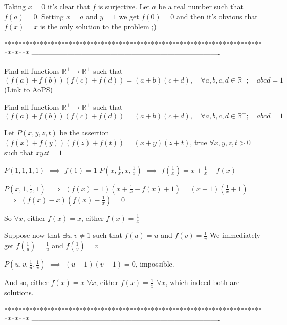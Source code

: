 \begin{solution}
	Taking $x=0$ it's clear that $f$ is surjective. Let $a$ be a real number such that$f(a)=0$. Setting $x=a$ and $y=1$ we get $f(0)=0$ and then it's obvious that $f(x)=x$ is the only solution to the problem ;)
\end{solution}
*******************************************************************************
-------------------------------------------------------------------------------

\begin{problem}
	Find all functions $\mathbb R^+\to\mathbb R^+$ such that \[(f(a)+f(b))(f(c)+f(d))=(a+b)(c+d), \quad \forall a,b,c,d\in\mathbb R^+; \quad abcd=1\]
	\flushright \href{https://artofproblemsolving.com/community/c6h612328}{(Link to AoPS)}
\end{problem}



\begin{solution}
	\begin{tcolorbox}Find all functions $\mathbb R^+\to\mathbb R^+$ such that \[(f(a)+f(b))(f(c)+f(d))=(a+b)(c+d), \quad \forall a,b,c,d\in\mathbb R^+; \quad abcd=1\]\end{tcolorbox}
Let $P(x,y,z,t)$ be the assertion $(f(x)+f(y))(f(z)+f(t))=(x+y)(z+t)$, true $\forall x,y,z,t>0$ such that $xyzt=1$

$P(1,1,1,1)$ $\implies$ $f(1)=1$
$P(x,\frac 1x,x,\frac 1x)$ $\implies$ $f(\frac 1x)=x+\frac 1x-f(x)$

$P(x,1,\frac 1x,1)$ $\implies$ $(f(x)+1)(x+\frac 1x-f(x)+1)=(x+1)(\frac 1x+1)$ $\implies$ $(f(x)-x)(f(x)-\frac 1x)=0$

So $\forall x$, either $f(x)=x$, either $f(x)=\frac 1x$

Suppose now that $\exists u,v\ne 1$ such that $f(u)=u$ and $f(v)=\frac 1v$
We immediately get $f(\frac 1u)=\frac 1u$ and $f(\frac 1v)=v$

$P(u,v,\frac 1u,\frac 1v)$ $\implies$ $(u-1)(v-1)=0$, impossible.

And so, either $\boxed{f(x)=x}$ $\forall x$, either $\boxed{f(x)=\frac 1x}$ $\forall x$, which indeed both are solutions.
\end{solution}
*******************************************************************************
-------------------------------------------------------------------------------


